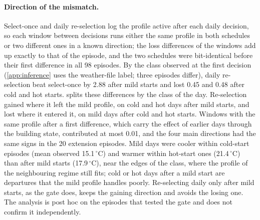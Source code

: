\paragraph{Direction of the mismatch.} Select-once and daily re-selection log the profile active after each daily decision, so each
window between decisions runs either the same profile in both schedules or two different ones in a known direction; the loss
differences of the windows add up exactly to that of the episode, and the two schedules were bit-identical before their first
difference in all 98 episodes. By the class observed at the first decision (\cref{app:inference} uses the weather-file label;
three episodes differ), daily re-selection beat select-once by 2.88\pp{} after mild starts and lost
0.45 and 0.48\pp{} after cold and hot starts.  splits these
differences by the class of the day. Re-selection gained where it left the mild profile, on cold and hot days after mild starts, and lost where it
entered it, on mild days after cold and hot starts. Windows with the same profile
after a first difference, which carry the effect of earlier days through the building state, contributed at most
0.01\pp, and the four main directions had the same signs in the 20 extension episodes. Mild days were cooler within cold-start
episodes (mean observed 15.1\,$^\circ$C) and warmer within hot-start ones (21.4\,$^\circ$C) than after
mild starts (17.9\,$^\circ$C), near the edges of the class, where the profile of the neighbouring regime still fits;
cold or hot days after a mild start are departures that the mild profile handles poorly. Re-selecting daily only after mild
starts, as the gate does, keeps the gaining direction and avoids the losing one. The analysis is post hoc on the episodes that
tested the gate and does not confirm it independently.
